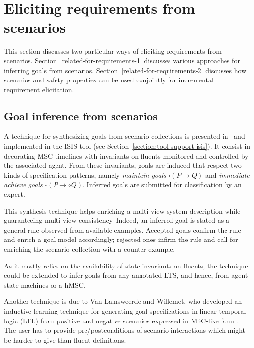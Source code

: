 \section{Eliciting requirements from scenarios\label{section:related-for-requirements}}

This section discusses two particular ways of eliciting requirements from scenarios. Section~\ref{related-for-requirements-1} discusses various approaches for inferring goals from scenarios. Section~\ref{related-for-requirements-2} discusses how scenarios and safety properties can be used conjointly for incremental requirement elicitation. 

\subsection{Goal inference from scenarios\label{related-for-requirements-1}}

A technique for synthesizing goals from scenario collections is presented in~\cite{Damas:2006, Damas:2011} and implemented in the ISIS tool (see Section~\ref{section:tool-support-isis}). It consist in decorating MSC timelines with invariants on fluents monitored and controlled by the associated agent. From these invariants, goals are induced that respect two kinds of specification patterns, namely \emph{maintain goals} $\square(P \rightarrow Q)$ and \emph{immediate achieve goals} $\square(P \rightarrow \circ Q)$. Inferred goals are submitted for classification by an expert. 

This synthesis technique helps enriching a multi-view system description while guaranteeing multi-view consistency. Indeed, an inferred goal is stated as a general rule observed from available examples. Accepted goals confirm the rule and enrich a goal model accordingly; rejected ones infirm the rule and call for enriching the scenario collection with a counter example. 

As it mostly relies on the availability of state invariants on fluents, the technique could be extended to infer goals from any annotated LTS, and hence, from agent state machines or a hMSC. 

Another technique is due to Van Lamsweerde and Willemet, who developed an inductive learning technique for generating goal specifications in linear temporal logic (LTL) from positive and negative scenarios expressed in MSC-like form \cite{VanLamsweerde:1998}. The user has to provide pre/postconditions of scenario interactions which might be harder to give than fluent definitions.

